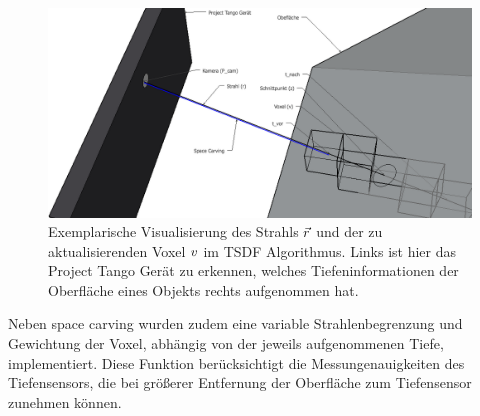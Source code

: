 \begin{figure}[h]
  \centering
	\includegraphics[width=1.0\textwidth]{content/images/methods/tsdf-sketch.png} 
  \caption{Exemplarische Visualisierung des Strahls $\protect\vec{r}$ und der zu aktualisierenden Voxel $\protect v$ im TSDF Algorithmus. Links ist hier das Project Tango Gerät zu erkennen, welches Tiefeninformationen der Oberfläche eines Objekts rechts aufgenommen hat.}
  \label{fig:tsdf-sketch}
\end{figure}

Neben space carving wurden zudem eine variable Strahlenbegrenzung und Gewichtung der Voxel, abhängig von der jeweils aufgenommenen Tiefe, implementiert. Diese Funktion berücksichtigt die Messungenauigkeiten des Tiefensensors, die bei größerer Entfernung der Oberfläche zum Tiefensensor zunehmen können. \citep{Klingensmith_2015_7924}
